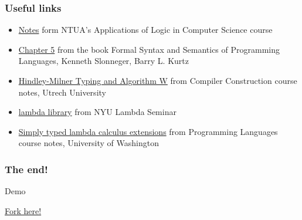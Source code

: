 \documentclass[xcolor=table]{beamer}
\begin{document}
\begin{frame}
\frametitle{Useful links}
\begin{block}
{
\begin{footnotesize}
\begin{itemize}
\item \href{http://www.math.ntua.gr/logic/lambda/notes/shmeiwseis-2011.pdf}{Notes} form NTUA's Applications of Logic in Computer Science course %
\item \href{http://homepage.cs.uiowa.edu/~slonnegr/plf/Book/Chapter5.pdf}{Chapter 5} from the book Formal Syntax and Semantics of Programming Languages, Kenneth Slonneger, Barry L. Kurtz
\item \href{http://www.cs.uu.nl/wiki/pub/Cco/CourseSchedule/cco-09-typesystems-2x2.pdf}{Hindley-Milner Typing and Algorithm W} from Compiler Construction course notes, Utrech University %
\item \href{http://lambda.jimpryor.net/lambda_library/}{lambda library} from NYU Lambda Seminar %
\item \href{http://homes.cs.washington.edu/~djg/2011sp/lec11_6up.pdf}{Simply typed lambda calculus extensions} from Programming Languages course notes, University of Washington %
\end{itemize}
\end{footnotesize}
}

\end{block}
\end{frame}

\begin{frame}
\frametitle{The end!}
\begin{block}
{\begin{center}
{\large Demo}
\end{center}}
\begin{center}
 \href{https://github.com/zoep/jebus}{Fork here!}
 \end{center} 
\end{block}
\end{frame}
\end{document}
